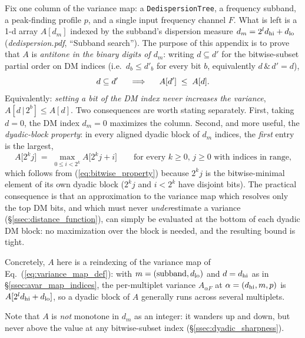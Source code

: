 \documentclass{article}
\numberwithin{equation}{section}   %
\newcommand{\ddnotes}[1]{{\em dedispersion.pdf}, ``#1''}
\begin{document}
Fix one column of the variance map: a {\tt DedispersionTree}, a frequency subband, a
peak-finding profile $p$, and a single input frequency channel $F$. What is left is a 1-d
array $A[d_m]$ indexed by the subband's dispersion measure
$d_m = 2^l d_{\rm hi} + d_{\rm lo}$ (\ddnotes{Subband search}). The purpose of this
appendix is to prove that $A$ is {\em antitone in the binary digits of $d_m$}: writing
$d \subseteq d'$ for the bitwise-subset partial order on DM indices (i.e.\ $d_b \le d'_b$
for every bit $b$, equivalently $d \,\&\, d' = d$),
\begin{equation}
d \subseteq d' \hspace{5mm} \Longrightarrow \hspace{5mm} A[d'] \;\le\; A[d].
\label{eq:bitwise_property}
\end{equation}
Equivalently: {\em setting a bit of the DM index never increases the variance},
$A[d \,|\, 2^b] \le A[d]$. Two consequences are worth stating separately. First, taking
$d = 0$, the DM index $d_m=0$ maximizes the column. Second, and more useful, the
{\em dyadic-block property}: in every aligned dyadic block of $d_m$ indices, the {\em first}
entry is the largest,
\begin{equation}
A\big[ 2^k j \big] \;=\; \max_{0 \le i < 2^k} A\big[ 2^k j + i \big]
  \qquad \mbox{for every $k \ge 0$, $j \ge 0$ with indices in range,}
\label{eq:dyadic_property}
\end{equation}
which follows from (\ref{eq:bitwise_property}) because $2^kj$ is the bitwise-minimal element
of its own dyadic block ($2^kj$ and $i < 2^k$ have disjoint bits). The practical consequence
is that an approximation to the variance map which resolves only the top DM bits, and which
must never {\em under}estimate a variance (\S\ref{ssec:distance_function}), can simply be
evaluated at the bottom of each dyadic DM block: no maximization over the block is needed,
and the resulting bound is tight.

Concretely, $A$ here is a reindexing of the variance map of
Eq.\ (\ref{eq:variance_map_def}): with $m = (\mbox{subband}, d_{\rm lo})$ and $d = d_{\rm hi}$
as in \S\ref{ssec:avar_map_indices}, the per-multiplet variance $A_{\alpha F}$ at
$\alpha = (d_{\rm hi}, m, p)$ is $A[2^l d_{\rm hi} + d_{\rm lo}]$, so a dyadic block of $A$
generally runs across several multiplets.

Note that $A$ is {\em not} monotone in $d_m$ as an integer: it wanders up and down, but never
above the value at any bitwise-subset index (\S\ref{ssec:dyadic_sharpness}).
\end{document}
